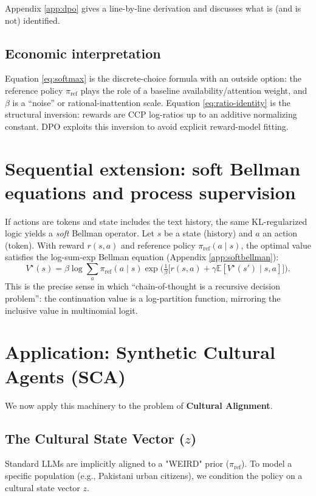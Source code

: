 \documentclass[11pt]{article}
\theoremstyle{plain}
\theoremstyle{definition}
\theoremstyle{remark}
\newcommand{\E}{\mathbb{E}}
\newcommand{\1}{\mathbf{1}}
\newcommand{\refpol}{\pi_{\mathrm{ref}}}
\begin{document}
\noindent Appendix \ref{app:dpo} gives a line-by-line derivation and discusses what is (and is not) identified.

\subsection{Economic interpretation}
Equation \eqref{eq:softmax} is the discrete-choice formula with an outside option: the reference policy $\refpol$ plays the role of a baseline availability/attention weight, and $\beta$ is a ``noise'' or rational-inattention scale. Equation \eqref{eq:ratio-identity} is the structural inversion: rewards are CCP log-ratios up to an additive normalizing constant. DPO exploits this inversion to avoid explicit reward-model fitting.

\section{Sequential extension: soft Bellman equations and process supervision}\label{sec:extension}

If actions are tokens and state includes the text history, the same KL-regularized logic yields a \emph{soft} Bellman operator.
Let $s$ be a state (history) and $a$ an action (token). With reward $r(s,a)$ and reference policy $\refpol(a\mid s)$, the optimal value satisfies the log-sum-exp Bellman equation (Appendix \ref{app:softbellman}):
\[
V^\star(s)
=
\beta \log \sum_{a}\refpol(a\mid s)\exp\Big(\tfrac{1}{\beta}\big[r(s,a)+\gamma \E[V^\star(s')\mid s,a]\big]\Big).
\]
This is the precise sense in which ``chain-of-thought is a recursive decision problem'': the continuation value is a log-partition function, mirroring the inclusive value in multinomial logit.

\section{Application: Synthetic Cultural Agents (SCA)}\label{sec:culture}

We now apply this machinery to the problem of \textbf{Cultural Alignment}.

\subsection{The Cultural State Vector ($z$)}
Standard LLMs are implicitly aligned to a "WEIRD" prior ($\refpol$). To model a specific population (e.g., Pakistani urban citizens), we condition the policy on a cultural state vector $z$.
\end{document}
